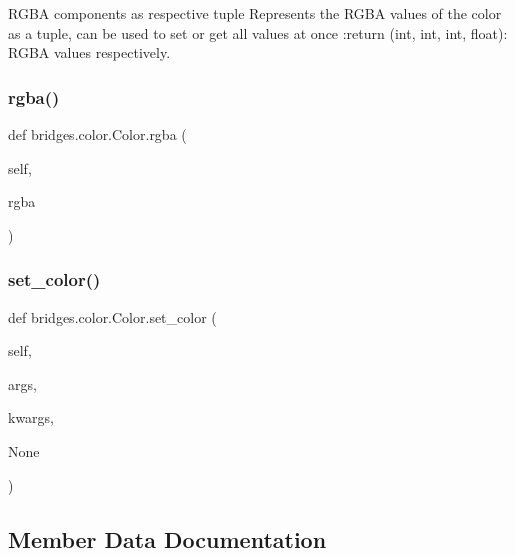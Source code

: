R\+G\+BA components as respective tuple Represents the R\+G\+BA values of the color as a tuple, can be used to set or get all values at once \+:return (int, int, int, float)\+: R\+G\+BA values respectively. 

\mbox{\label{classbridges_1_1color_1_1_color_aa3d8dcfea52715f28400b08bf15e94ab}} 
\subsubsection{\texorpdfstring{rgba()}{rgba()}\hspace{0.1cm}{\footnotesize\ttfamily [2/2]}}
{\footnotesize\ttfamily def bridges.\+color.\+Color.\+rgba (\begin{DoxyParamCaption}\item[{}]{self,  }\item[{}]{rgba }\end{DoxyParamCaption})}

\mbox{\label{classbridges_1_1color_1_1_color_a99b17a81feb1737f8b29c93ae9ef4bc8}} 
\subsubsection{\texorpdfstring{set\+\_\+color()}{set\_color()}}
{\footnotesize\ttfamily def bridges.\+color.\+Color.\+set\+\_\+color (\begin{DoxyParamCaption}\item[{}]{self,  }\item[{}]{args,  }\item[{}]{kwargs,  }\item[{}]{None }\end{DoxyParamCaption})}



\subsection{Member Data Documentation}
\mbox{\label{classbridges_1_1color_1_1_color_a2e170f068eeb77ace0427d23b36f2b27}} 
